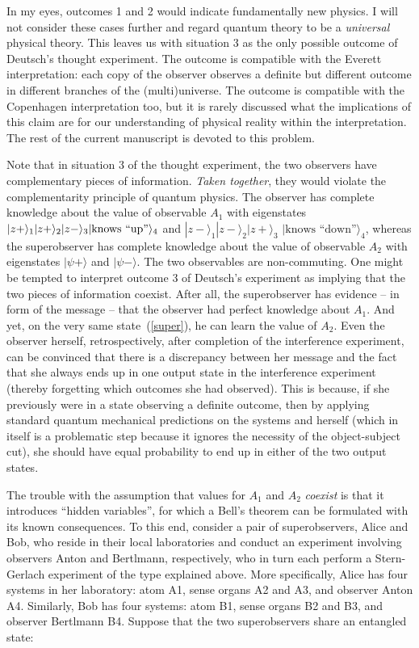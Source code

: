 \documentclass[12pt,a4]{article}
\begin{document}
In my eyes, outcomes 1 and 2 would indicate fundamentally new physics. I will not consider these cases further and regard quantum theory to be a {\it universal} physical theory. This leaves us with situation 3 as the only possible outcome of Deutsch's thought experiment. The outcome is compatible with the Everett interpretation: each copy of the observer observes a definite but different outcome in different branches of the (multi)universe. The outcome is compatible with the Copenhagen interpretation too, but it is rarely discussed what the implications of this claim are for our understanding of physical reality within the interpretation. The rest of the current manuscript is devoted to this problem.   

Note that in situation 3 of the thought experiment, the two observers have complementary pieces of information. {\it Taken together}, they would violate the complementarity principle of quantum physics. The observer has complete knowledge about the value of observable $A_1$ with eigenstates $|z+\rangle_1|z+\rangle_2|z-\rangle_3| \break\mbox{knows ``up''} \rangle_4$ and $|z-\rangle_1|z-\rangle_2|z+\rangle_3 $ $ |\mbox{knows ``down''}\rangle_4$, whereas the superobserver has complete knowledge about the value of observable $A_2$ with eigenstates $|\psi+\rangle$ and $|\psi-\rangle$. The two observables are non-commuting. One might be tempted to interpret outcome 3 of Deutsch's experiment as implying that the two pieces of information coexist. After all, the superobserver has evidence -- in form of the message -- that the observer had perfect knowledge about $A_1$. And yet, on the very same state~(\ref{super}), he can learn the value of $A_2$. Even the observer herself, retrospectively, after completion of the interference experiment, can be convinced that there is a discrepancy between her message and the fact that she always ends up in one output state in the interference experiment (thereby forgetting which outcomes she had observed). This is because, if she previously were in a state observing a definite outcome, then by applying standard quantum mechanical predictions on the systems and herself (which in itself is a problematic step because it ignores the necessity of the object-subject cut), she should have equal probability to end up in either of the two output states. 

The trouble with the assumption that values for $A_1$ and $A_2$ {\it coexist} is that it introduces ``hidden variables'', for which a Bell's theorem can be formulated with its known consequences. To this end, consider a pair of superobservers, Alice and Bob, who reside in their local laboratories and conduct an experiment involving observers Anton and Bertlmann, respectively, who in turn each perform a Stern-Gerlach experiment of the type explained above. More specifically, Alice has four systems in her laboratory: atom A1, sense organs A2 and A3, and observer Anton A4. Similarly, Bob has four systems: atom B1, sense organs B2 and B3, and observer Bertlmann B4. Suppose that the two superobservers share an entangled state:
\end{document}
